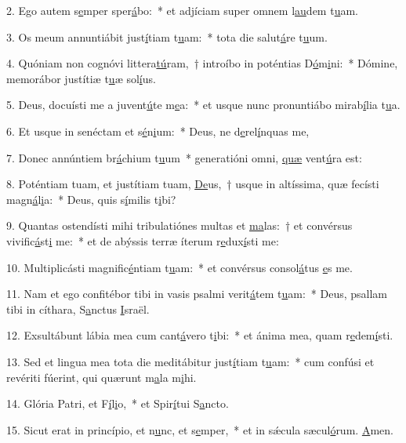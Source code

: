 2. Ego autem s\uline{e}mper sper\uline{á}bo:~* et adjíciam super omnem l\uline{au}dem t\uline{u}am.\par 
3. Os meum annuntiábit just\uline{í}tiam t\uline{u}am:~* tota die salut\uline{á}re t\uline{u}um.\par 
4. Quóniam non cognóvi littera\uline{tú}ram,~† introíbo in poténtias D\uline{ó}m\uline{i}ni:~* Dómine, memorábor justítiæ t\uline{u}æ sol\uline{í}us.\par 
5. Deus, docuísti me a juvent\uline{ú}te m\uline{e}a:~* et usque nunc pronuntiábo mirab\uline{í}lia t\uline{u}a.\par 
6. Et usque in senéctam et s\uline{é}n\uline{i}um:~* Deus, ne d\uline{e}rel\uline{í}nquas me,\par 
7. Donec annúntiem br\uline{á}chium t\uline{u}um~* generatióni omni, \uline{quæ} vent\uline{ú}ra est:\par 
8. Poténtiam tuam, et justítiam tuam, \uline{De}us,~† usque in altíssima, quæ fecísti magn\uline{á}l\uline{i}a:~* Deus, quis s\uline{í}milis t\uline{i}bi?\par 
9. Quantas ostendísti mihi tribulatiónes multas et \uline{ma}las:~† et convérsus vivific\uline{á}st\uline{i} me:~* et de abýssis terræ íterum r\uline{e}dux\uline{í}sti me:\par 
10. Multiplicásti magnific\uline{é}ntiam t\uline{u}am:~* et convérsus consol\uline{á}tus \uline{e}s me.\par 
11. Nam et ego confitébor tibi in vasis psalmi verit\uline{á}tem t\uline{u}am:~* Deus, psallam tibi in cíthara, S\uline{a}nctus \uline{I}sraël.\par 
12. Exsultábunt lábia mea cum cant\uline{á}vero t\uline{i}bi:~* et ánima mea, quam r\uline{e}dem\uline{í}sti.\par 
13. Sed et lingua mea tota die meditábitur just\uline{í}tiam t\uline{u}am:~* cum confúsi et revériti fúerint, qui quærunt m\uline{a}la m\uline{i}hi.\par 
14. Glória Patri, et F\uline{í}l\uline{i}o,~* et Spir\uline{í}tui S\uline{a}ncto.\par 
15. Sicut erat in princípio, et n\uline{u}nc, et s\uline{e}mper,~* et in sǽcula sæcul\uline{ó}rum. \uline{A}men.\par 
